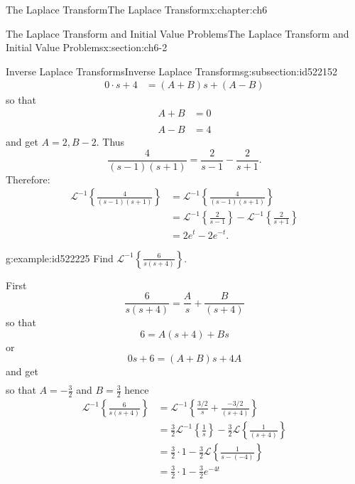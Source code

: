 \documentclass[oneside,10pt,]{book}
\numberwithin{equation}{section}
\numberwithin{equation}{section}
\newcommand{\amp}{&}
\begin{document}
\begin{chapterptx}{The Laplace Transform}{}{The Laplace Transform}{}{}{x:chapter:ch6}
\begin{sectionptx}{The Laplace Transform and Initial Value Problems}{}{The Laplace Transform and Initial Value Problems}{}{}{x:section:ch6-2}
\begin{subsectionptx}{Inverse Laplace Transforms}{}{Inverse Laplace Transforms}{}{}{g:subsection:id522152}
\begin{align*}
0\cdot s+4 \amp =\left(A+B\right)s+\left(A-B\right)
\end{align*}
so that%
\begin{align*}
A+B \amp =0\\\\
A-B \amp =4
\end{align*}
and get \(A=2,B-2\). Thus%
\begin{equation*}
\frac{4}{\left(s-1\right)\left(s+1\right)}=\frac{2}{s-1}-\frac{2}{s+1}.
\end{equation*}
Therefore:%
\begin{align*}
\mathcal{L}^{-1}\left\{ \frac{4}{\left(s-1\right)\left(s+1\right)}\right\}  \amp =\mathcal{L}^{-1}\left\{ \frac{4}{\left(s-1\right)\left(s+1\right)}\right\}\\
\amp =\mathcal{L}^{-1}\left\{ \frac{2}{s-1}\right\} -\mathcal{L}^{-1}\left\{ \frac{2}{s+1}\right\} \\
\amp =2e^{t}-2e^{-t}.
\end{align*}
%
\begin{example}{}{g:example:id522225}%
Find \(\mathcal{L}^{-1}\left\{ \frac{6}{s\left(s+4\right)}\right\} \).%
\par
First%
\begin{equation*}
\frac{6}{s\left(s+4\right)}=\frac{A}{s}+\frac{B}{\left(s+4\right)}
\end{equation*}
so that%
\begin{equation*}
6=A\left(s+4\right)+Bs
\end{equation*}
or%
\begin{equation*}
0s+6=\left(A+B\right)s+4A
\end{equation*}
and get%
\begin{align*}
\end{align*}
so that \(A=-\frac{3}{2}\) and \(B=\frac{3}{2}\) hence%
\begin{align*}
\mathcal{L}^{-1}\left\{ \frac{6}{s\left(s+4\right)}\right\}  \amp =\mathcal{L}^{-1}\left\{ \frac{3/2}{s}+\frac{-3/2}{\left(s+4\right)}\right\} \\
\amp =\frac{3}{2}\mathcal{L}^{-1}\left\{ \frac{1}{s}\right\} -\frac{3}{2}\mathcal{L}\left\{ \frac{1}{\left(s+4\right)}\right\} \\
\amp =\frac{3}{2}\cdot1-\frac{3}{2}\mathcal{L}\left\{ \frac{1}{s-(-4)}\right\} \\
\amp =\frac{3}{2}\cdot1-\frac{3}{2}e^{-4t}
\end{align*}
%
\end{example}
\end{subsectionptx}

\end{sectionptx}
\end{chapterptx}
\end{document}
